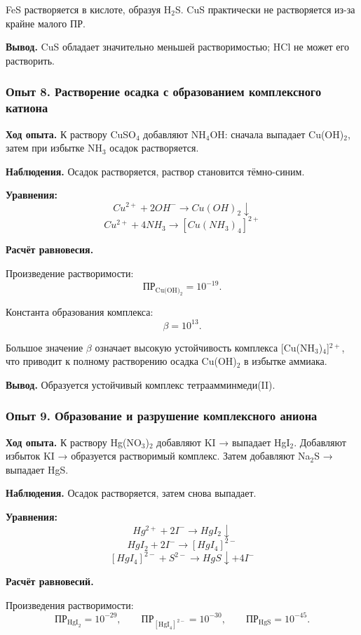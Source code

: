 \documentclass[a4paper,12pt]{article}
\begin{document}
	\quad FeS растворяется в кислоте, образуя H$_2$S.  
	CuS практически не растворяется из-за крайне малого ПР.
	
	\textbf{Вывод.}  
	CuS обладает значительно меньшей растворимостью; HCl не может его растворить.
	
	
	\subsubsection*{Опыт 8. Растворение осадка с образованием комплексного катиона}
	
	\quad\textbf{ Ход опыта.}  
	К раствору CuSO$_4$ добавляют NH$_4$OH: сначала выпадает Cu(OH)$_2$, затем при избытке NH$_3$ осадок растворяется.
	
	\textbf{Наблюдения.}  
	Осадок растворяется, раствор становится тёмно-синим.
	
	\textbf{Уравнения:}
	\[
	Cu^{2+} + 2OH^- \rightarrow Cu(OH)_2\downarrow
	\]
	\[
	Cu^{2+} + 4NH_3 \rightarrow [Cu(NH_3)_4]^{2+}
	\]
	
	\textbf{Расчёт равновесия.}
	
	Произведение растворимости:
	\[
	\text{ПР}_{\text{Cu(OH)}_2} = 10^{-19}.
	\]
	
	Константа образования комплекса:
	\[
	\beta = 10^{13}.
	\]
	
	\quad Большое значение $\beta$ означает высокую устойчивость комплекса [Cu(NH$_3$)$_4$]$^{2+}$, что приводит к полному растворению осадка Cu(OH)$_2$ в избытке аммиака.
	
	\textbf{Вывод.}  
	Образуется устойчивый комплекс тетраамминмеди(II).
	
	\subsubsection*{Опыт 9. Образование и разрушение комплексного аниона}
	
	\quad\textbf{ Ход опыта.}  
	К раствору Hg(NO$_3$)$_2$ добавляют KI → выпадает HgI$_2$.  
	Добавляют избыток KI → образуется растворимый комплекс.  
	Затем добавляют Na$_2$S → выпадает HgS.
	
	\textbf{Наблюдения.}  
	Осадок растворяется, затем снова выпадает.
	
	\textbf{Уравнения:}
	\[
	Hg^{2+} + 2I^- \rightarrow HgI_2\downarrow
	\]
	\[
	HgI_2 + 2I^- \rightarrow [HgI_4]^{2-}
	\]
	\[
	[HgI_4]^{2-} + S^{2-} \rightarrow HgS\downarrow + 4I^-
	\]
	
	\textbf{Расчёт равновесий.}
	
	Произведения растворимости:
	\[
	\text{ПР}_{\text{HgI}_2} = 10^{-29}, \qquad
	\text{ПР}_{[\text{HgI}_4]^{2-}} = 10^{-30}, \qquad
	\text{ПР}_{\text{HgS}} = 10^{-45}.
	\]
	
\end{document}
